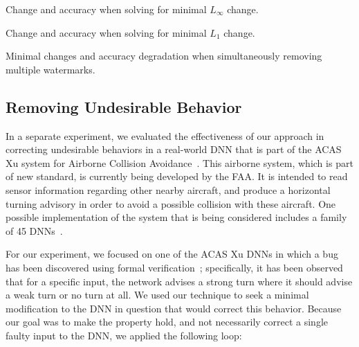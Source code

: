 \documentclass{easychair}
\begin{document}
\begin{table}
\begin{subtable}{1\textwidth}
\centering
{}
\caption{Change and accuracy when solving for minimal $L_\infty$ change.}
\end{subtable}
\begin{subtable}{1\textwidth}
\centering
{}
\caption{Change and accuracy when solving for minimal $L_1$ change.}
\end{subtable}
\caption{Minimal changes and accuracy degradation when simultaneously removing multiple watermarks.}
\label{table:multipleWatermarks}
\end{table}


\subsection{Removing Undesirable Behavior}

In a separate experiment, we evaluated the effectiveness of our
approach in correcting undesirable behaviors in a real-world DNN that
is part of the ACAS Xu system for Airborne Collision
Avoidance~\cite{JuLoBrOwKo16}. This airborne system, which is part of new
standard, is currently being developed by the FAA. It is intended to
read sensor information regarding other nearby aircraft, and produce a
horizontal turning advisory in order to avoid a possible collision
with these aircraft. One possible implementation of the system that is
being considered includes a family of 45 DNNs~\cite{JuLoBrOwKo16}.

For our experiment, we focused on one of the ACAS Xu DNNs in which a
bug has been discovered using formal
verification~\cite{KaBaDiJuKo17Reluplex}; specifically, it has been
observed that for a specific input, the network advises a strong turn
where it should advise a weak turn or no turn at all. We used our
technique to seek a minimal modification to the DNN in question that
would correct this behavior. Because our goal was to make the property
hold, and not necessarily correct a single faulty input to the DNN, we
applied the following loop:
\end{document}
